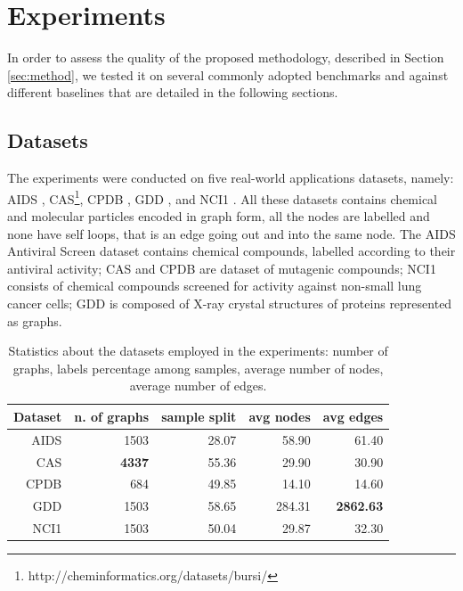 
\chapter{Experiments}
\label{Chapter4}

In order to assess the quality of the proposed methodology, described in Section
\ref{sec:method}, we tested it on several commonly adopted benchmarks and against
different baselines that are detailed in the following sections.

\section{Datasets}
\label{subsec:datasets}

The experiments were conducted on five real-world applications datasets, namely:
AIDS \cite{Weislow19041989}, CAS\footnote{http://cheminformatics.org/datasets/bursi/},
CPDB \cite{journals/jcisd/HelmaCKR04}, GDD \cite{dobson2003}, and NCI1 \cite{journals/kais/WaleWK08}.
All these datasets contains chemical and molecular particles encoded in graph form,
all the nodes are labelled and none have self loops, that is an edge going out
and into the same node.
The AIDS Antiviral Screen dataset contains chemical compounds, labelled according to
their antiviral activity; CAS and CPDB are dataset of mutagenic
compounds; NCI1 consists of chemical compounds screened for activity against 
non-small lung cancer cells; GDD is composed of X-ray crystal structures of
proteins represented as graphs.
    \begin{table}[ht]
        \centering
        \begin{tabular}{|r|r|r|r|r|}
            \hline
            Dataset & n. of graphs & sample split & avg nodes & avg edges \\ \hline
            AIDS    & 1503         & 28.07        & 58.90     & 61.40     \\ \hline      
            CAS     & \textbf{4337} & 55.36        & 29.90     & 30.90     \\ \hline      
            CPDB    &  684         & 49.85        & 14.10     & 14.60     \\ \hline      
            GDD     & 1503         & 58.65        & 284.31    & \textbf{2862.63}   \\ \hline      
            NCI1    & 1503         & 50.04        & 29.87     & 32.30     \\ \hline      
        \end{tabular}
        \caption{Statistics about the datasets employed in the experiments: number
        of graphs, labels percentage among samples, average number of nodes, average
        number of edges.}
        \label{table:datasets}
    \end{table}

